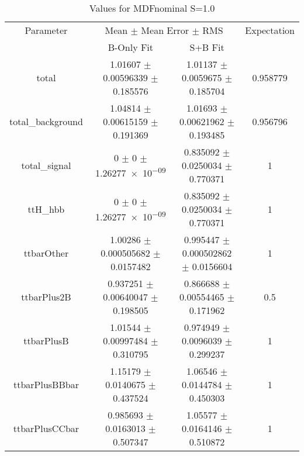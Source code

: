\begin{table}
\centering
\caption{Values for MDFnominal S=1.0}
\begin{tabular}{cccc}
\toprule
Parameter & \multicolumn{2}{c}{Mean $\pm$ Mean Error $\pm$ RMS} & Expectation\\
 & B-Only Fit & S+B Fit & \\
\midrule
total & \num{1.01607} $\pm$ \num{0.00596339} $\pm$ \num{0.185576} & \num{1.01137} $\pm$ \num{0.0059675} $\pm$ \num{0.185704} & \num{0.958779}\\
total\_background & \num{1.04814} $\pm$ \num{0.00615159} $\pm$ \num{0.191369} & \num{1.01693} $\pm$ \num{0.00621962} $\pm$ \num{0.193485} & \num{0.956796}\\
total\_signal & \num{0} $\pm$ \num{0} $\pm$ \num{1.26277e-09} & \num{0.835092} $\pm$ \num{0.0250034} $\pm$ \num{0.770371} & \num{1}\\
ttH\_hbb & \num{0} $\pm$ \num{0} $\pm$ \num{1.26277e-09} & \num{0.835092} $\pm$ \num{0.0250034} $\pm$ \num{0.770371} & \num{1}\\
ttbarOther & \num{1.00286} $\pm$ \num{0.000505682} $\pm$ \num{0.0157482} & \num{0.995447} $\pm$ \num{0.000502862} $\pm$ \num{0.0156604} & \num{1}\\
ttbarPlus2B & \num{0.937251} $\pm$ \num{0.00640047} $\pm$ \num{0.198505} & \num{0.866688} $\pm$ \num{0.00554465} $\pm$ \num{0.171962} & \num{0.5}\\
ttbarPlusB & \num{1.01544} $\pm$ \num{0.00997484} $\pm$ \num{0.310795} & \num{0.974949} $\pm$ \num{0.0096039} $\pm$ \num{0.299237} & \num{1}\\
ttbarPlusBBbar & \num{1.15179} $\pm$ \num{0.0140675} $\pm$ \num{0.437524} & \num{1.06546} $\pm$ \num{0.0144784} $\pm$ \num{0.450303} & \num{1}\\
ttbarPlusCCbar & \num{0.985693} $\pm$ \num{0.0163013} $\pm$ \num{0.507347} & \num{1.05577} $\pm$ \num{0.0164146} $\pm$ \num{0.510872} & \num{1}\\
\bottomrule
\end{tabular}
\end{table}